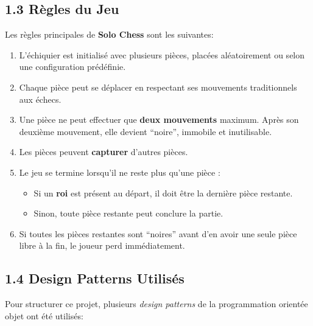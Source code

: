 \documentclass[11pt,a4paper]{article}
\begin{document}
\subsection*{1.3 Règles du Jeu}
Les règles principales de \textbf{Solo Chess} sont les suivantes:
\begin{enumerate}[label=\arabic*.]
    \item L’échiquier est initialisé avec plusieurs pièces, placées aléatoirement ou selon une configuration prédéfinie.
    \item Chaque pièce peut se déplacer en respectant ses mouvements traditionnels aux échecs.
    \item Une pièce ne peut effectuer que \textbf{deux mouvements} maximum. Après son deuxième mouvement, elle devient “noire”, immobile et inutilisable.
    \item Les pièces peuvent \textbf{capturer} d’autres pièces.
    \item Le jeu se termine lorsqu’il ne reste plus qu’une pièce :
    \begin{itemize}
        \item Si un \textbf{roi} est présent au départ, il doit être la dernière pièce restante.
        \item Sinon, toute pièce restante peut conclure la partie.
    \end{itemize}
    \item Si toutes les pièces restantes sont “noires” avant d’en avoir une seule pièce libre à la fin, le joueur perd immédiatement.
\end{enumerate}

\subsection*{1.4 Design Patterns Utilisés}
Pour structurer ce projet, plusieurs \emph{design patterns} de la programmation orientée objet ont été utilisés:
\end{document}
